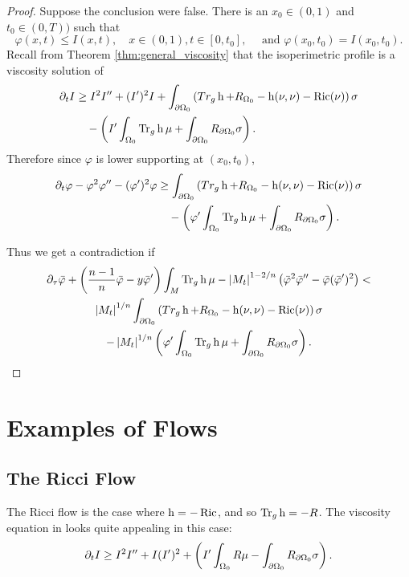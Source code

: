 \documentclass{amsart}
\begin{document}
\begin{proof}
Suppose the conclusion were false. There is an \(x_0 \in (0, 1)\) and \(t_0 \in (0, T))\) such that
\[
\varphi(x, t) \leq I(x, t), \quad x \in (0, 1), t \in [0, t_0], \quad \text{ and } \varphi(x_0, t_0) = I(x_0, t_0).
\]
Recall from Theorem \ref{thm:general_viscosity} that the isoperimetric profile is a viscosity solution of
\[
\begin{split}
\partial_t I &\geq I^2 I'' +  (I')^2 I + \int_{\partial {\Omega_0}} \left(Tr_g \operatorname{h} + R_{\Omega_0} - \operatorname{h}(\nu, \nu) - \operatorname{Ric}(\nu)\right) \sigma \\
&\quad - \left(I'\int_{\Omega_0} \operatorname{Tr}_g \operatorname{h} \mu + \int_{\partial {\Omega_0}} R_{\partial {\Omega_0}}\sigma \right).
\end{split}
\]
Therefore since \(\varphi\) is lower supporting at \((x_0, t_0)\),
\[
\begin{split}
\partial_t \varphi - \varphi^2 \varphi'' -  (\varphi')^2 \varphi &\geq \int_{\partial {\Omega_0}} \left(Tr_g \operatorname{h} + R_{\Omega_0} - \operatorname{h}(\nu, \nu) - \operatorname{Ric}(\nu)\right) \sigma \\
&\quad - \left(\varphi'\int_{\Omega_0} \operatorname{Tr}_g \operatorname{h} \mu + \int_{\partial {\Omega_0}} R_{\partial {\Omega_0}}\sigma \right).
\end{split}
\]

Thus we get a contradiction if
\begin{multline*}
\partial_{\tau} \bar{\varphi} + \left(\frac{n-1}{n} \bar{\varphi} - y \bar{\varphi}'\right) \int_M \operatorname{Tr}_g \operatorname{h} \mu - \left|{M_t}\right|^{1-2/n} \left(\bar{\varphi}^2 \bar{\varphi}'' - \bar{\varphi} (\bar{\varphi}')^2\right) < \\
\left|{M_t}\right|^{1/n}\int_{\partial {\Omega_0}} \left(Tr_g \operatorname{h} + R_{\Omega_0} - \operatorname{h}(\nu, \nu) - \operatorname{Ric}(\nu)\right) \sigma \\
- \left|{M_t}\right|^{1/n} \left(\varphi'\int_{\Omega_0} \operatorname{Tr}_g \operatorname{h} \mu + \int_{\partial {\Omega_0}} R_{\partial {\Omega_0}}\sigma \right).
\end{multline*}
\end{proof}

\section{Examples of Flows}
\label{sec:flows}

\subsection{The Ricci Flow}
\label{subsec:flows_ricci}

The Ricci flow is the case where $\operatorname{h} = -\operatorname{Ric}$, and so $\operatorname{Tr}_g \operatorname{h} = -R$. The viscosity equation in  looks quite appealing in this case:
\begin{equation}
\label{eq:viscosity_ricciflow}
\partial_t I \geq I^2I'' + I(I')^2 + \left(I'\int_{\Omega_0} R \mu - \int_{\partial {\Omega_0}} R_{\partial {\Omega_0}}\sigma \right).
\end{equation}
\end{document}
